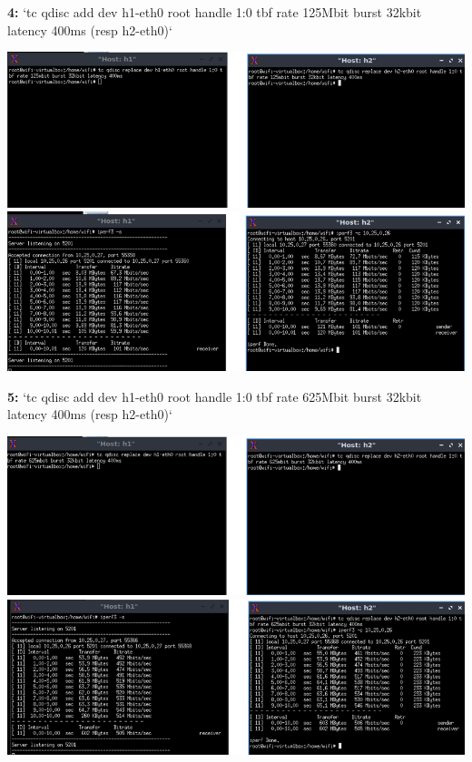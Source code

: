 \vspace{1cm}
\textbf{4:} `tc qdisc add dev h1-eth0 root handle 1:0 tbf rate 125Mbit burst 32kbit latency 400ms (resp h2-eth0)`
\begin{center}
    \includegraphics[width=1\textwidth]{./images/ValuerMoyenneCommande.png} \\
    \includegraphics[width=1\textwidth]{./images/ValeurMoyenneResultat.png}
\end{center}
\vspace{1cm}
\hspace{0.5cm}\textbf{5:} `tc qdisc add dev h1-eth0 root handle 1:0 tbf rate 625Mbit burst 32kbit latency 400ms (resp h2-eth0)`
\begin{center}
    \includegraphics[width=1\textwidth]{./images/ValuerDefautCommande.png} 
    \includegraphics[width=1\textwidth]{./images/ValuerDefautResultat.png}
\end{center}
